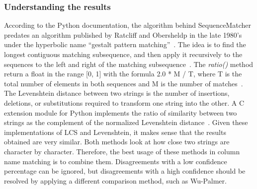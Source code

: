 \subsubsection{Understanding the results}
According to the Python documentation, the algorithm behind SequenceMatcher predates an algorithm published by Ratcliff
and Obersheldp in the late 1980's under the hyperbolic name ``gestalt pattern matching''~\cite{difflib}.
The idea is to find the longest contiguous matching subsequence, and then apply it recursively to the sequences to the
left and right of the matching subsequence~\cite{difflib}.
The \textit{ratio()} method return a float in the range [0, 1] with the formula 2.0 * M / T, where T is the total number
of elements in both sequences and M is the number of matches~\cite{difflib}.
The Levenshtein distance between two strings is the number of insertions, deletions, or substitutions required to transform
one string into the other.
A C extension module for Python implements the ratio of similarity between two strings as the complement of the normalized
Levenshtein distance~\cite{Levenshtein}.
Given these implementations of LCS and Levenshtein, it makes sense that the results obtained are very similar.
Both methods look at how close two strings are character by character.
Therefore, the best usage of these methods in column name matching is to combine them.
Disagreements with a low confidence percentage can be ignored, but disagreements with a high confidence should be resolved
by applying a different comparison method, such as Wu-Palmer.

\bigbreak


